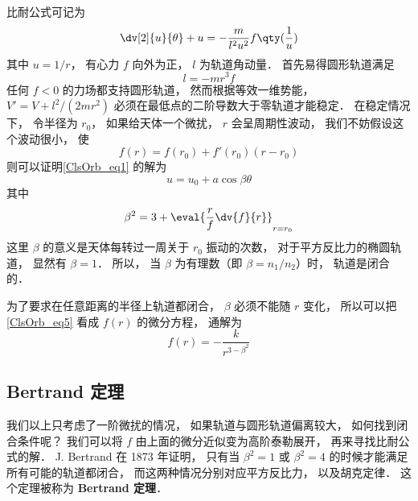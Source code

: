 

比耐公式可记为
\begin{equation}\label{ClsOrb_eq1}
\dv[2]{u}{\theta} + u = -\frac{m}{l^2 u^2} f\qty(\frac 1u)
\end{equation}
其中 $u = 1/r$， 有心力 $f$ 向外为正， $l$ 为轨道角动量． 首先易得圆形轨道满足
\begin{equation}
l = - m r^3 f
\end{equation}
任何 $f < 0$ 的力场都支持圆形轨道， 然而根据等效一维势能， $V' = V + l^2/(2mr^2)$ 必须在最低点的二阶导数大于零轨道才能稳定． 在稳定情况下， 令半径为 $r_0$， 如果给天体一个微扰， $r$ 会呈周期性波动， 我们不妨假设这个波动很小， 使
\begin{equation}
f(r) = f(r_0) + f'(r_0)(r-r_0)
\end{equation}
则可以证明\autoref{ClsOrb_eq1} 的解为
\begin{equation}
u = u_0 + a\cos\beta\theta
\end{equation}
其中
\begin{equation}\label{ClsOrb_eq5}
\beta^2 = 3 + \eval{\frac rf \dv{f}{r}}_{r = r_0}
\end{equation}
这里 $\beta$ 的意义是天体每转过一周关于 $r_0$ 振动的次数， 对于平方反比力的椭圆轨道， 显然有 $\beta = 1$． 所以， 当 $\beta$ 为有理数（即 $\beta = n_1/n_2$）时， 轨道是闭合的．

为了要求在任意距离的半径上轨道都闭合，  $\beta$ 必须不能随 $r$ 变化， 所以可以把\autoref{ClsOrb_eq5} 看成 $f(r)$ 的微分方程， 通解为
\begin{equation}
f(r) = - \frac{k}{r^{3-\beta^2}}
\end{equation}

\subsection{Bertrand 定理}
我们以上只考虑了一阶微扰的情况， 如果轨道与圆形轨道偏离较大， 如何找到闭合条件呢？ 我们可以将 $f$ 由上面的微分近似变为高阶泰勒展开， 再来寻找比耐公式的解． J. Bertrand 在 1873 年证明， 只有当 $\beta^2 = 1$ 或 $\beta^2 = 4$ 的时候才能满足所有可能的轨道都闭合， 而这两种情况分别对应平方反比力， 以及胡克定律． 这个定理被称为 \textbf{Bertrand 定理}．